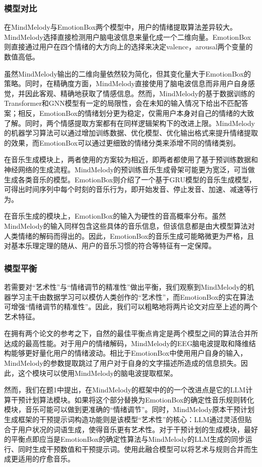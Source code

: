 \documentclass[12pt, fontset=windows]{ctexart}
\begin{document}
\subsubsection{模型对比}
在MindMelody与EmotionBox两个模型中，用户的情绪提取算法差异较大。MindMelody选择直接检测用户脑电波信息来量化成一个二维向量。EmotionBox则直接通过用户在四个情绪的大方向上的选择来决定valence，arousal两个变量的数值高低。

虽然MindMelody输出的二维向量依然较为简化，但其变化量大于EmotionBox的策略。同时，在精确度方面，MindMelody直接使用了脑电波信息而非用户自身感觉，并因此客观、精确地获取了情感信息。然而，MindMelody的基于数据训练的Transformer和GNN模型有一定的局限性，会在未知的输入情况下给出不匹配答案；相反，EmotionBox的情绪划分更为稳定，仅需用户本身对自己的情绪的大致了解。同时，两个情感提取方案都有在同样逻辑架构下的改进上限。MindMelody的机器学习算法可以通过增加训练数据、优化模型、优化输出格式来提升情绪提取的效果，而EmotionBox可以通过更细致的情绪分类来添增不同的情绪类别。

在音乐生成模块上，两者使用的方案较为相近，即两者都使用了基于预训练数据和神经网络的生成流程。MindMelody的预训练音乐生成骨架可能更为宽泛，可当做生成各类音乐的模型。EmotionBox则介绍了一个基于GRU模型的音乐生成模型，可得出时间序列中每个时刻的音乐行为，即开始发音、停止发音、加速、减速等行为。

在音乐生成的模块上，EmotionBox的输入为硬性的音高概率分布。虽然MindMelody的输入同样包含这些具体的音乐信息，但该信息都是由大模型算法对人类情绪的解码而得出的。因此，EmotionBox的音乐生成可能略微更为严格，且对基本乐理定理的随从、用户的音乐习惯的符合等特征有一定保障。

\subsubsection{模型平衡}
若需要对“艺术性”与“情绪调节的精准性”做出平衡，我们观察到MindMelody的机器学习主干由数据学习可以模仿人类创作的“艺术性”，而EmotionBox的实在算法可增强“情绪调节的精准性”。因此，我们可以粗略地将两片论文对应至上述的两个艺术特征。

在拥有两个论文的参考之下，自然的最佳平衡点肯定是两个模型之间的算法合并所达成的最高性能。对于用户的情绪解码，MindMelody的EEG脑电波提取和降维结构能够更好量化用户的情绪波动。相比于EmotionBox中使用用户自身的输入，MindMelody的参数提取跳过了用户对于自身的文字描述所造成的信息损失。因此，这个模块可以使用MindMelody的脑电波提取框架。

然而，我们在题1中提出，在MindMelody的框架中的的一个改进点是它的LLM计算干预计划算法模块。如果将这个部分替换为EmotionBox的确定性音乐规则转化模块，音乐可能可以做到更准确的“情绪调节”。同时，MindMelody原本干预计划生成框架的干预提示词构造功能则是该模型“艺术性”的核心：LLM通过灵活但贴合于用户状况的词语生成，使得音乐更有艺术性。对于干预计划的生成模块，最好的平衡点即应当是EmotionBox的确定性算法与MindMelody的LLM生成的同步运行、同时生成干预数值和干预提示词。使用此融合模型可以将艺术与规则合并而生成更适用的疗愈音乐。
\end{document}
